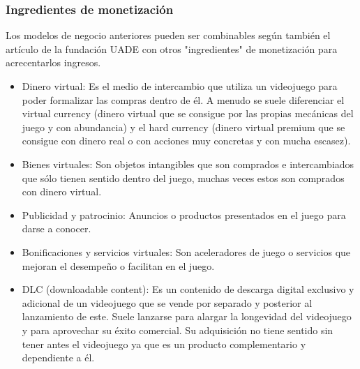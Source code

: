 \begin{table}[htbp]
{\begin{tabular}{llll}
	                           
	\end{tabular}
}
\end{table}



\subsubsection{Ingredientes de monetización}
Los modelos de negocio anteriores pueden ser combinables según también el artículo de la fundación UADE \cite{fundacionuade2014} con otros "ingredientes" de monetización para acrecentarlos ingresos. 
\begin{itemize}
	\item Dinero virtual: Es el medio de intercambio que utiliza un videojuego para poder formalizar las compras dentro de él. A menudo se suele diferenciar el virtual currency (dinero virtual que se consigue por las propias mecánicas del juego y con abundancia) y el hard currency (dinero virtual premium que se consigue con dinero real o con acciones muy concretas y con mucha escasez).
	\item Bienes virtuales: Son objetos intangibles que son comprados e intercambiados que sólo tienen sentido dentro del juego, muchas veces estos son comprados con dinero virtual. 
	\item Publicidad y patrocinio: Anuncios o productos presentados en el juego para darse a conocer.
	\item Bonificaciones y servicios virtuales: Son aceleradores de juego o servicios que mejoran el desempeño o facilitan en el juego.
	\item DLC (downloadable content): Es un contenido de descarga digital exclusivo y adicional de un videojuego que se vende por separado y posterior al lanzamiento de este. Suele lanzarse para alargar la longevidad del videojuego y para aprovechar su éxito comercial. Su adquisición no tiene sentido sin tener antes el videojuego ya que es un producto complementario y dependiente a él.
\end{itemize}
